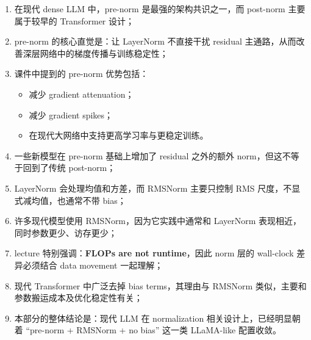 \documentclass[a4paper,UTF8]{article}
\numberwithin{equation}{section}
\begin{document}
\begin{enumerate}
    \item 在现代 dense LLM 中，pre-norm 是最强的架构共识之一，而 post-norm 主要属于较早的 Transformer 设计；
    \item pre-norm 的核心直觉是：让 LayerNorm 不直接干扰 residual 主通路，从而改善深层网络中的梯度传播与训练稳定性；
    \item 课件中提到的 pre-norm 优势包括：
    \begin{itemize}
        \item 减少 gradient attenuation；
        \item 减少 gradient spikes；
        \item 在现代大网络中支持更高学习率与更稳定训练。
    \end{itemize}
    \item 一些新模型在 pre-norm 基础上增加了 residual 之外的额外 norm，但这不等于回到了传统 post-norm；
    \item LayerNorm 会处理均值和方差，而 RMSNorm 主要只控制 RMS 尺度，不显式减均值，也通常不带 bias；
    \item 许多现代模型使用 RMSNorm，因为它实践中通常和 LayerNorm 表现相近，同时参数更少、访存更少；
    \item lecture 特别强调：\textbf{FLOPs are not runtime}，因此 norm 层的 wall-clock 差异必须结合 data movement 一起理解；
    \item 现代 Transformer 中广泛去掉 bias terms，其理由与 RMSNorm 类似，主要和参数搬运成本及优化稳定性有关；
    \item 本部分的整体结论是：现代 LLM 在 normalization 相关设计上，已经明显朝着 ``pre-norm + RMSNorm + no bias'' 这一类 LLaMA-like 配置收敛。
\end{enumerate}
\end{document}
